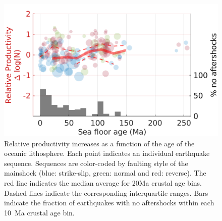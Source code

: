 \documentclass[draft]{agujournal}
\begin{document}
\begin{figure}[H]
\centering
\includegraphics{figures/prod_vs_age_mw5.png}
\caption{Relative productivity  increases as a function of the age of the oceanic lithosphere. Each point indicates an individual earthquake sequence. Sequences are color-coded by faulting style of the mainshock (blue: strike-slip, green: normal and red: reverse). The red line indicates the median average for 20Ma crustal age bins. Dashed lines indicate the corresponding interquartile ranges. Bars indicate the fraction of earthquakes with no aftershocks within each 10~Ma crustal age bin.}
\label{fig:prod_vs_age}
\end{figure}   
\end{document}
